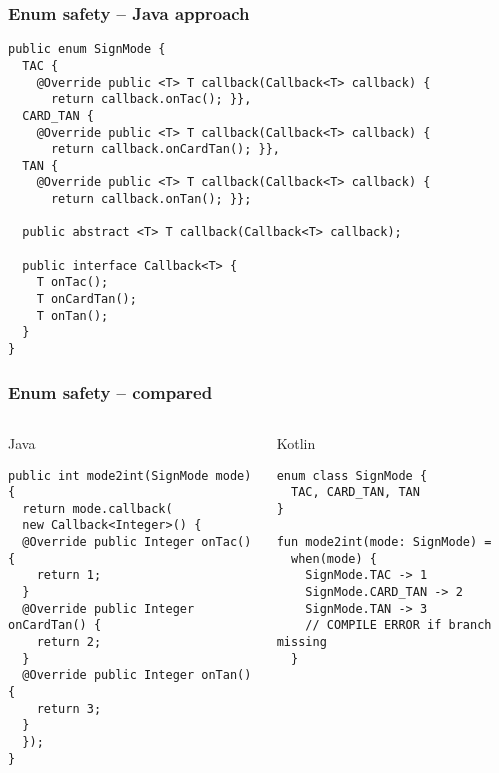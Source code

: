 
\begin{frame}[fragile] \frametitle{Enum safety -- Java approach}
\begin{lstlisting}[basicstyle=\color{IJ_text}\ttfamily\tiny]
public enum SignMode {
  TAC {
    @Override public <T> T callback(Callback<T> callback) {
      return callback.onTac(); }},
  CARD_TAN {
    @Override public <T> T callback(Callback<T> callback) {
      return callback.onCardTan(); }},
  TAN {
    @Override public <T> T callback(Callback<T> callback) {
      return callback.onTan(); }};

  public abstract <T> T callback(Callback<T> callback);

  public interface Callback<T> {
    T onTac();
    T onCardTan();
    T onTan();
  }
}

\end{lstlisting}
\end{frame}

\begin{frame}[fragile]
\frametitle{Enum safety -- compared}
\begin{columns}[t]
\begin{column}{0.5\textwidth}
\begin{center}
  Java
\end{center}
\begin{lstlisting}[style=twosided]
public int mode2int(SignMode mode) {
  return mode.callback(
  new Callback<Integer>() {
  @Override public Integer onTac() {
    return 1;
  }
  @Override public Integer onCardTan() {
    return 2;
  }
  @Override public Integer onTan() {
    return 3;
  }
  });
}
\end{lstlisting}
\end{column}
\begin{column}{0.5\textwidth}
\begin{center}
  Kotlin
\end{center}
\begin{lstlisting}[style=twosided]
enum class SignMode {
  TAC, CARD_TAN, TAN
}

fun mode2int(mode: SignMode) =
  when(mode) {
    SignMode.TAC -> 1
    SignMode.CARD_TAN -> 2
    SignMode.TAN -> 3
    // COMPILE ERROR if branch missing
  }
\end{lstlisting}
\end{column}
\end{columns}
\end{frame}



